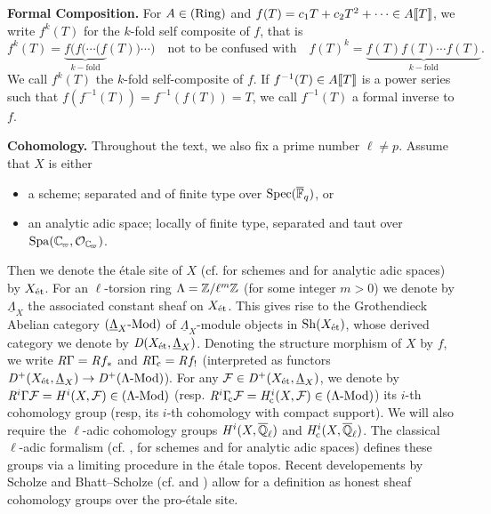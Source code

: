 \documentclass[../main.tex]{subfiles}
\begin{document}
\textbf{Formal Composition.}
For $A \in {(\mathrm{Ring})}$ and $f(T) = c_1 T + c_2 T^2 + \dots \in A\llbracket T \rrbracket$, we
write $f^k(T)$ for the $k$-fold self composite of $f$, that is
\begin{equation*}
  f^k(T) = \underbrace{f(f( \cdots (f}_{k-\text{fold}}(T)) \cdots) \quad \text{not to be confused with}
  \quad f(T)^k = \underbrace{f(T) f(T) \cdots f(T)}_{k-\text{fold}}.
\end{equation*}
We call $f^k(T)$ the $k$-fold self-composite of $f$. If $f^{-1}(T) \in A\llbracket T \rrbracket$
is a power series such that $f(f^{-1}(T)) = f^{-1}(f(T)) = T$, we call
$f^{-1}(T)$ a formal inverse to $f$.

\textbf{Cohomology.} 
Throughout the text, we also fix a prime number $\ell \neq p$.
Assume that $X$ is either 
\begin{itemize}
  \item a scheme; separated and of finite type over $\operatorname{Spec}({\overline {\mathbb{F}}_q})$, or
  \item an analytic adic space; locally of finite type, separated and taut over
    $\spa(\Cp, \cO_\Cp)$. 
\end{itemize}
Then we denote the \'etale site of $X$ (cf. \cite{LeiFuEtale} for schemes and
\cite{huber2013etale} for analytic adic spaces) by $X_{\textnormal{\'et}}$. For an
$\ell$-torsion ring $\Lambda = \mathbb{Z}/\ell^m \mathbb{Z}$ (for some integer $m>0$) we denote
by $\underline \Lambda_X$ the associated constant sheaf on $X_{\textnormal{\'et}}$. This gives
rise to the Grothendieck Abelian category ${({\underline \Lambda_X}\textnormal-\allowbreak\mathrm{Mod})}$ of
$\underline \Lambda_X$-module objects in $\mathrm{Sh}(X_{\textnormal{\'et}})$, whose derived category
we denote by $\mathit D(X_{\textnormal{\'et}}, \underline \Lambda_X)$. 
Denoting the structure morphism of $X$ by $f$, we write 
$\mathit R \Gamma = \mathit R f_*$ and $\mathit R \Gamma_{\hspace{-2pt}\mathrm{c}} = \mathit R f_!$ (interpreted as functors
$\mathit D^+(X_{\textnormal{\'et}}, \underline \Lambda_X) \to \mathit D^+{({\Lambda}\textnormal-\allowbreak\mathrm{Mod})}$).
For any $\mathcal{F} \in \mathit D^+(X_{\textnormal{\'et}}, \underline \Lambda_X)$, we denote 
by $\mathit R^i\Gamma\mathcal{F} = \mathit H^i(X, \mathcal{F}) \in {({\Lambda}\textnormal-\allowbreak\mathrm{Mod})}$ (resp. $\mathit R^i \Gamma_{\hspace{-2pt}\mathrm{c}} \mathcal{F} = 
\mathit H_{\mathrm{c}}^i(X, \mathcal{F}) \in {({\Lambda}\textnormal-\allowbreak\mathrm{Mod})}$) its $i$-th cohomology group (resp, its
$i$-th cohomology with compact support).
We will also require the $\ell$-adic cohomology groups $\mathit H^i(X, {\overline {\mathbb{Q}}_\ell})$ 
and $\mathit H_{\mathrm{c}}^i(X, {\overline {\mathbb{Q}}_\ell})$. The classical $\ell$-adic formalism (cf. \cite{LeiFuEtale},
\cite{jannsen1988continuous} for schemes and \cite{huber1998comparison} for
analytic adic spaces) defines these groups via a limiting procedure in the 
\'etale topos. Recent developements by Scholze and Bhatt--Scholze (cf.
\cite{scholze2017etale} and \cite{bhattscholze2013pro}) allow for a definition
as honest sheaf cohomology groups over the pro-\'etale site.
\end{document}
